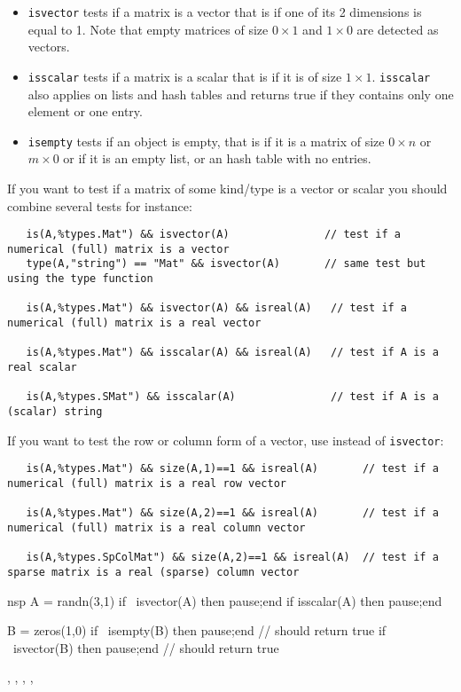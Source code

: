 \begin{mandescription}
\begin{itemize}
\item \verb+isvector+ tests if a matrix is a vector that is if one of its 2 dimensions is equal to 1. 
      Note that empty matrices of size $0 \times 1$ and $1 \times 0$ are detected as vectors.
\item \verb+isscalar+ tests if a matrix is a scalar that is if it is of size $1 \times 1$.
      \verb+isscalar+ also applies on lists and hash tables and returns true if they contains only
      one element or one entry.
\item \verb+isempty+ tests if an object is empty, that is if it is a matrix of size $0 \times n$ or $m \times 0$ or
      if it is an empty list, or an hash table with no entries.
\end{itemize}

If you want to test if a matrix of some kind/type is a vector or scalar you should combine
several tests for instance:
\begin{verbatim}
   is(A,%types.Mat") && isvector(A)               // test if a numerical (full) matrix is a vector
   type(A,"string") == "Mat" && isvector(A)       // same test but using the type function

   is(A,%types.Mat") && isvector(A) && isreal(A)   // test if a numerical (full) matrix is a real vector

   is(A,%types.Mat") && isscalar(A) && isreal(A)   // test if A is a real scalar

   is(A,%types.SMat") && isscalar(A)               // test if A is a (scalar) string
\end{verbatim}

If you want to test the row or column form of a vector, use  instead of \verb+isvector+:
\begin{verbatim}
   is(A,%types.Mat") && size(A,1)==1 && isreal(A)       // test if a numerical (full) matrix is a real row vector

   is(A,%types.Mat") && size(A,2)==1 && isreal(A)       // test if a numerical (full) matrix is a real column vector

   is(A,%types.SpColMat") && size(A,2)==1 && isreal(A)  // test if a sparse matrix is a real (sparse) column vector
\end{verbatim}
\end{mandescription}

\begin{examples}
\begin{mintednsp}{nsp}
A = randn(3,1)
if ~isvector(A) then pause;end
if isscalar(A) then pause;end

B = zeros(1,0)
if ~isempty(B) then pause;end // should return true
if ~isvector(B) then pause;end // should return true
\end{mintednsp}
\end{examples}

\begin{manseealso}
   , , , ,  
\end{manseealso}

